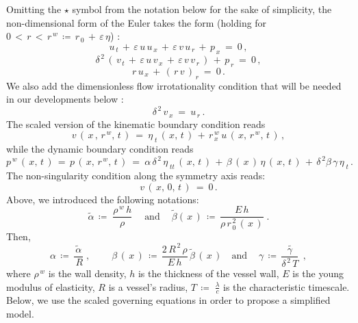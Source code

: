 \documentclass[alpha-refs, 12pt]{wiley-article}
\newcommand{\eps}{\varepsilon}
\begin{document}
Omitting the $\star$ symbol from the notation below for the sake of simplicity, the non-dimensional form of the Euler takes the form (holding for $0\, < \,r\, <\, r^{\,w}\,\coloneqq\,r_{\,0}\,+\,\eps\,\eta$) \cite{Mitsotakis2018}:
\begin{equation}\label{eq:momentx}
  u_{\,t}\,+\,\eps\,u\,u_{\,x}\,+\,\eps\,v\, u_{\,r}\,+\,p_{\,x}\ =\ 0\,,
\end{equation}
\begin{equation}\label{eq:momenty}
  \delta^{\,2}\,(\,v_{\,t}\,+\,\eps\,u\,v_{\,x}\,+\,\eps\,v \,v_{\,r}\,)\,+\,p_{\,r}\ =\ 0\,,
\end{equation}
\begin{equation}\label{eq:cont}
  r\,u_{\,x}\,+\,(\,r\,v\,)_{\,r}\ =\ 0\,.
\end{equation}
We also add the dimensionless flow irrotationality condition that will be needed in our developments below \cite{Landau1987}:
\begin{equation}\label{eq:irr}
  \delta^{\,2}\,v_{\,x}\ =\ u_{\,r}\,.
\end{equation}
The scaled version of the kinematic boundary condition reads
\begin{equation}\label{eq:kin}
  v\,(\,x\,,\,r^{\,w},\,t\,)\ =\ \eta_{\;t}\,(\,x,\,t\,)\,+\,r_{\,x}^{\,w}\,u\,(\,x,\,r^{\,w},\,t\,)\,,
\end{equation}
while the dynamic boundary condition reads
\begin{equation}\label{eq:dyn}
  p^{\,w}\,(\,x,\,t\,)\,=\,p\,(\,x,\,r^{\,w},\,t\,)\ =\ \alpha\,\delta^{\,2}\,\eta_{\;tt}\,(\,x,\,t\,)\,+\,\beta\,(\,x\,)\,\eta\,(\,x,\,t\,)\,+\,\delta^{\,2}\beta\,\gamma\,\eta_{\;t}\,.
\end{equation}
The non-singularity condition along the symmetry axis reads:
\begin{equation}\label{eq:zero}
  v\,(\,x,\,0,\,t\,)\ =\ 0\,.
\end{equation}
Above, we introduced the following notations:
\begin{equation*}
  \tilde{\alpha}\,\coloneqq\;\frac{\rho^{\,w}\,h}{\rho}\; \quad \text{and} \ \quad \tilde{\beta}(\,x\,)\,\coloneqq\, \frac{E\,h}{\rho\,r_{\,0}^{\,2}\,(\,x\,)}\;. 
\end{equation*}
Then,
\begin{equation*}
  \alpha\,\coloneqq\,\frac{\tilde{\alpha}}{\,R}\;, \quad  \ \quad  \beta\,(\,x\,)\,\coloneqq\,\frac{2\,R^{\,2}\,\rho}{E\,h}\,\tilde{\beta}\,(\,x\,) \quad \text{and} \ \quad \gamma\,\coloneqq\,\tilde{\frac{\gamma }{\delta^{\,2}\,T}\;}\,,
\end{equation*}
where $\rho^{\,w}$ is the wall density, $h$ is the thickness of the vessel wall, $E$ is the young modulus of elasticity, $R$ is a vessel's radius, $T\, \coloneqq \;\displaystyle\frac{\lambda}{c}$ is the characteristic timescale. Below, we use the scaled governing equations in order to propose a simplified model.
\end{document}
